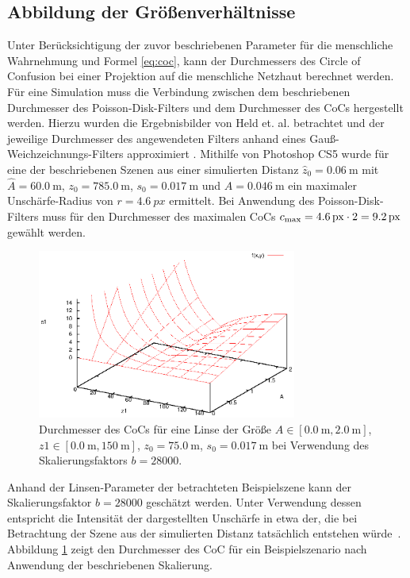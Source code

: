 \documentclass{acmsiggraph}                     %
\begin{document}
\subsection{Abbildung der Größenverhältnisse}
\label{sec:proportions}

Unter Berücksichtigung der zuvor beschriebenen Parameter für die menschliche Wahrnehmung und Formel \ref{eq:coc}, kann der Durchmessers des Circle of Confusion bei einer Projektion auf die menschliche Netzhaut berechnet werden. Für eine Simulation muss die Verbindung zwischen dem beschriebenen Durchmesser des Poisson-Disk-Filters und dem Durchmesser des CoCs hergestellt werden. Hierzu wurden die Ergebnisbilder von Held et. al. betrachtet und der jeweilige Durchmesser des angewendeten Filters anhand eines Gauß-Weichzeichnungs-Filters approximiert \cite{Held:2010cr}. Mithilfe von Photoshop CS5 wurde für eine der beschriebenen Szenen aus einer simulierten Distanz $\hat z_0 = \SI{0.06}{\meter}$ mit $\hat A = \SI{60.0}{\meter}$, $z_0 = \SI{785.0}{\meter}$, $s_0 = \SI{0.017}{\meter}$ und $A = \SI{0.046}{\meter}$ ein maximaler Unschärfe-Radius von $r = \SI{4.6}{px}$ ermittelt. Bei Anwendung des Poisson-Disk-Filters muss für den Durchmesser des maximalen CoCs $c_{\textnormal{max}} = \SI{4.6}{px} \cdot 2 = \SI{9.2}{px}$ gewählt werden.

\begin{figure}[htbp]
\centering
\includegraphics[width=3.35in]{DoF-Graph}
\caption{Durchmesser des CoCs für eine Linse der Größe $A \in [\SI{0.0}{\meter},\SI{2.0}{\meter}]$, $z1 \in [\SI{0.0}{\meter},\SI{150}{\meter}]$, $z_0 = \SI{75.0}{\meter}$, $s_0 =\SI{0.017}{\meter}$ bei Verwendung des Skalierungsfaktors $b = 28000$.}
\label{abb:cocgraph}
\end{figure}

Anhand der Linsen-Parameter der betrachteten Beispielszene kann der Skalierungsfaktor $b = 28000$ geschätzt werden. Unter Verwendung dessen entspricht die Intensität der dargestellten Unschärfe in etwa der, die bei Betrachtung der Szene aus der simulierten Distanz tatsächlich entstehen würde~\cite{Held:2010cr}. Abbildung \ref{abb:cocgraph} zeigt den Durchmesser des CoC für ein Beispielszenario nach Anwendung der beschriebenen Skalierung.
\end{document}
